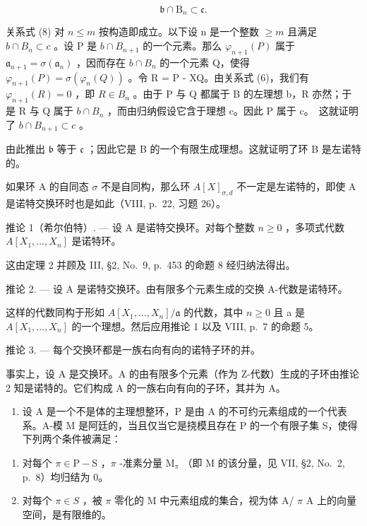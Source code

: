 \[
\mathfrak {b} \cap \mathrm{B} _ {n} \subset \mathfrak {c}.\tag{8}
\]

关系式 (8) 对 \(n \leqslant m\) 按构造即成立。以下设 n 是一个整数 \(\geqslant m\) 且满足 \(b \cap B_{n} \subset c\) 。设 P 是 \(b \cap B_{n+1}\) 的一个元素。那么 \(\varphi_{n+1}(P)\) 属于 \(\mathfrak{a}_{n+1} = \sigma(\mathfrak{a}_{n})\) ，因而存在 \(b \cap B_{n}\) 的一个元素 Q，使得 \(\varphi_{n+1}(P) = \sigma(\varphi_{n}(Q))\) 。令 R = P - XQ。由关系式 (6)，我们有 \(\varphi_{n+1}(R) = 0\) ，即 \(R \in B_{n}\) 。由于 P 与 Q 都属于 B 的左理想 b，R 亦然；于是 R 与 Q 属于 \(b \cap B_{n}\) ，而由归纳假设它含于理想 c。因此 P 属于 c。~这就证明了 \(b \cap B_{n+1} \subset c\) 。

由此推出 \(\mathfrak{b}\) 等于 \(\mathfrak{c}\) ；因此它是 B 的一个有限生成理想。这就证明了环 B 是左诺特的。

如果环 A 的自同态 \(\sigma\) 不是自同构，那么环 \(A[X]_{\sigma,d}\) 不一定是左诺特的，即使 A 是诺特交换环时也是如此（VIII, p.~22, 习题 26）。

推论 1（希尔伯特）. --- 设 A 是诺特交换环。对每个整数 \(n \geqslant 0\) ，多项式代数 \(A[X_{1}, \ldots, X_{n}]\) 是诺特环。

这由定理 2 并顾及 III, §2, No.~9, p.~453 的命题 8 经归纳法得出。

推论 2. --- 设 A 是诺特交换环。由有限多个元素生成的交换 A-代数是诺特环。

这样的代数同构于形如 \(A[X_{1},\ldots,X_{n}]/\mathfrak{a}\) 的代数，其中 \(n \geqslant 0\) 且 a 是 \(A[X_{1},\ldots,X_{n}]\) 的一个理想。然后应用推论 1 以及 VIII, p.~7 的命题 5。

推论 3. --- 每个交换环都是一族右向有向的诺特子环的并。

事实上，设 A 是交换环。A 的由有限多个元素（作为 Z-代数）生成的子环由推论 2 知是诺特的。它们构成 A 的一族右向有向的子环，其并为 A。


\begin{enumerate}
\def\labelenumi{\arabic{enumi})}
\tightlist
\item
  设 A 是一个不是体的主理想整环，P 是由 A 的不可约元素组成的一个代表系。A-模 M 是阿廷的，当且仅当它是挠模且存在 P 的一个有限子集 S，使得下列两个条件被满足：
\end{enumerate}

\begin{enumerate}
\def\labelenumi{(\roman{enumi})}
\item
  对每个 \(\pi \in \mathrm{P} - \mathrm{S}\) ，\(\pi\) -准素分量 \(\mathrm{M}_{\pi}\) （即 \(\mathrm{M}\) 的该分量，见 VII, §2, No.~2, p.~8）均归结为 0。
\item
  对每个 \(\pi\in S\) ，被 \(\pi\) 零化的 M 中元素组成的集合，视为体 A/ \(\pi\) A 上的向量空间，是有限维的。
\end{enumerate}


